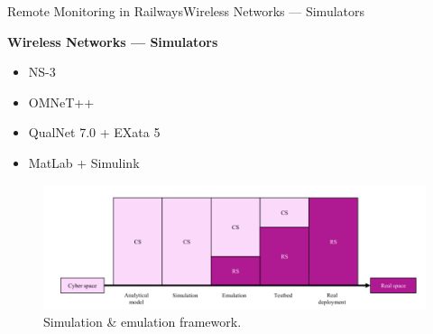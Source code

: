 \begin{frame}{Remote Monitoring in Railways}{Wireless Networks --- Simulators}
\begin{block}{\textbf{Wireless Networks --- Simulators}}
	
	\begin{minipage}[t]{0.48\linewidth}
		\begin{itemize}
			\item NS-3
			\item OMNeT++
			\item QualNet 7.0 + EXata 5
			\item MatLab + Simulink
		\end{itemize}
	\end{minipage}\hfill
	\begin{minipage}[t]{0.48\linewidth}
		
		\begin{figure}[ht!]
			\centering
			\includegraphics[width=1\textwidth,keepaspectratio]{figures/33.WirelessN/simul_VS_emul}
			\caption{Simulation \& emulation framework.}
		\end{figure}
	
	\end{minipage}
	
	
	
\end{block}
\end{frame}






